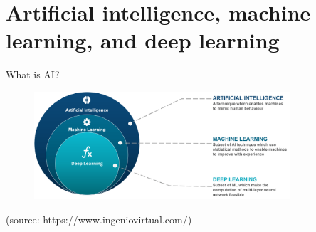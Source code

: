 \documentclass[10pt,aspectratio=169,dvipsnames]{beamer} %
\begin{document}
	
	\setcounter{subfigure}{0}
	\section{Artificial intelligence, machine learning, and deep learning}
	\begin{frame}{What is AI?}
		\begin{figure}
				\centering
				\includegraphics[width=0.85\textwidth]{AI_vs_ML_vs_Deep_Learning.png}
			\end{figure}
		\tiny
		(source: https://www.ingeniovirtual.com/)
	\end{frame}
\end{document}
